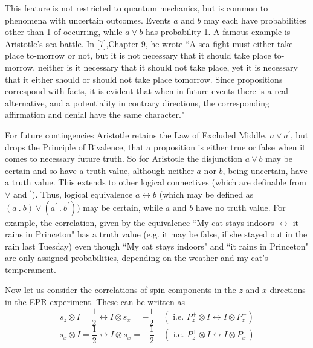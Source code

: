 \documentclass{article}
\begin{document}
This feature is not restricted to quantum mechanics, but is common to phenomena with uncertain outcomes. Events $a$ and $b$ may each have probabilities other than 1 of occurring, while $a \vee b$ has probability 1. A famous example is Aristotle's sea battle. In [7],Chapter 9, he wrote  
``A sea-fight must either take place to-morrow or not, but it is not necessary that it should take place to-morrow, neither is it necessary that it should not take place, yet it is necessary that it either should or should not take place tomorrow. Since propositions correspond with facts, it is evident that when in future events there is a real alternative, and a potentiality in contrary directions, the corresponding affirmation and denial have the same character."

For future contingencies Aristotle retains the Law of Excluded Middle, $a \vee a^\prime$, but drops the Principle of Bivalence, that a proposition is either true or false when it comes to necessary future truth. So for Aristotle the disjunction  $a\vee b$ may be certain and so have a truth value, although neither $a$ nor $b$, being uncertain, have a truth value. This extends to other logical connectives (which are definable from $\vee$ and $^\prime$). Thus, logical equivalence $a\leftrightarrow b$ (which may be defined as $(a\ .\ b) \vee (a^\prime \ . \ b^\prime))$ may be certain, while $a$ and $b$ have no truth value. For example, the correlation, given by the equivalence ``My cat stays indoors $\leftrightarrow$ it rains in Princeton" has a truth value (e.g. it may be false, if she stayed out in the rain last Tuesday) even though ``My cat stays indoors" and ``it rains in Princeton" are only assigned probabilities, depending on the weather and my cat's temperament.

Now let us consider the correlations of spin components in the $z$ and $x$ directions in the EPR experiment. These can be written as 
\begin{equation}
s_z\otimes I = \frac{1}{2} \leftrightarrow I\otimes s_x = -\frac{1}{2} \hspace{1em} (\mbox{ i.e. } P_z^+\otimes I \leftrightarrow I\otimes P_z^-)
\end{equation}
\begin{equation}
s_x\otimes I = \frac{1}{2} \leftrightarrow I\otimes s_x = -\frac{1}{2} \hspace{1em}(\mbox{ i.e. } P_z^+ \otimes I \leftrightarrow I \otimes P_x^-)
\end{equation}
                                                             
\end{document}
